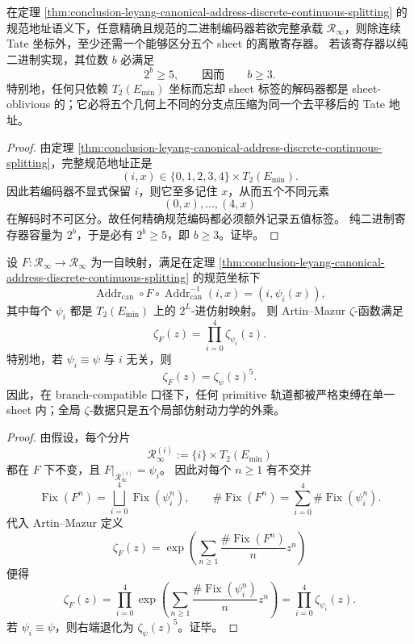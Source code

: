 \begin{corollary}\label{cor:conclusion-leyang-canonical-binary-sheet-lower-bound}
在定理 \ref{thm:conclusion-leyang-canonical-address-discrete-continuous-splitting} 的规范地址语义下，任意精确且规范的二进制编码器若欲完整承载 \(\mathcal R_\infty\)，则除连续 Tate 坐标外，至少还需一个能够区分五个 sheet 的离散寄存器。
若该寄存器以纯二进制实现，其位数 \(b\) 必满足
\[
2^b\ge 5,
\qquad\text{因而}\qquad
b\ge 3.
\]
特别地，任何只依赖 \(T_2(E_{\min})\) 坐标而忘却 sheet 标签的解码器都是 sheet-oblivious 的；它必将五个几何上不同的分支点压缩为同一个去平移后的 Tate 地址。
\end{corollary}
\begin{proof}
由定理 \ref{thm:conclusion-leyang-canonical-address-discrete-continuous-splitting}，完整规范地址正是
\[
(i,x)\in\{0,1,2,3,4\}\times T_2(E_{\min}).
\]
因此若编码器不显式保留 \(i\)，则它至多记住 \(x\)，从而五个不同元素
\[
(0,x),\dots,(4,x)
\]
在解码时不可区分。故任何精确规范编码都必须额外记录五值标签。
纯二进制寄存器容量为 \(2^b\)，于是必有 \(2^b\ge 5\)，即 \(b\ge 3\)。证毕。
\end{proof}

\begin{proposition}\label{prop:conclusion-leyang-branch-compatible-zeta-fivefold-factorization}
设 \(F:\mathcal R_\infty\to\mathcal R_\infty\) 为一自映射，满足在定理 \ref{thm:conclusion-leyang-canonical-address-discrete-continuous-splitting} 的规范坐标下
\[
\operatorname{Addr}_{\mathrm{can}}\circ F\circ \operatorname{Addr}_{\mathrm{can}}^{-1}(i,x)
=(i,\psi_i(x)),
\]
其中每个 \(\psi_i\) 都是 \(T_2(E_{\min})\) 上的 \(2^L\)-进仿射映射。
则 Artin--Mazur \(\zeta\)-函数满足
\[
\zeta_F(z)=\prod_{i=0}^{4}\zeta_{\psi_i}(z).
\]
特别地，若 \(\psi_i\equiv \psi\) 与 \(i\) 无关，则
\[
\zeta_F(z)=\zeta_{\psi}(z)^5.
\]
因此，在 branch-compatible 口径下，任何 primitive 轨道都被严格束缚在单一 sheet 内；全局 \(\zeta\)-数据只是五个局部仿射动力学的外乘。
\end{proposition}
\begin{proof}
由假设，每个分片
\[
\mathcal R_\infty^{(i)}:=\{i\}\times T_2(E_{\min})
\]
都在 \(F\) 下不变，且 \(F|_{\mathcal R_\infty^{(i)}}=\psi_i\)。
因此对每个 \(n\ge 1\) 有不交并
\[
\operatorname{Fix}(F^n)
=
\bigsqcup_{i=0}^{4}\operatorname{Fix}(\psi_i^n),
\qquad
\#\operatorname{Fix}(F^n)=\sum_{i=0}^{4}\#\operatorname{Fix}(\psi_i^n).
\]
代入 Artin--Mazur 定义
\[
\zeta_F(z)=\exp\!\left(\sum_{n\ge 1}\frac{\#\operatorname{Fix}(F^n)}{n}z^n\right)
\]
便得
\[
\zeta_F(z)
=
\prod_{i=0}^{4}
\exp\!\left(\sum_{n\ge 1}\frac{\#\operatorname{Fix}(\psi_i^n)}{n}z^n\right)
=
\prod_{i=0}^{4}\zeta_{\psi_i}(z).
\]
若 \(\psi_i\equiv \psi\)，则右端退化为 \(\zeta_\psi(z)^5\)。证毕。
\end{proof}

